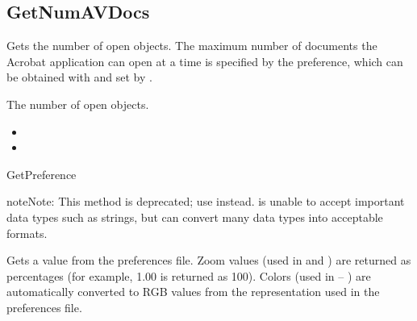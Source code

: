 \documentclass[letterpaper,12pt,english,openany,oneside]{sphinxmanual}
\begin{document}
\subsection{GetNumAVDocs}
\label{\detokenize{IAC_API_OLE_Objects:getnumavdocs}}
Gets the number of open  objects. The maximum number of documents the Acrobat application can open at a time is specified by the  preference, which can be obtained with   and set by   .


\begin{sphinxVerbatim}[commandchars=\\\{\}]
 
\end{sphinxVerbatim}


The number of open  objects.

\label{\detokenize{IAC_API_OLE_Objects:related-methods-7}}
\begin{itemize}
\item {} 
 

\item {} 
 

\end{itemize}



GetPreference

\begin{sphinxadmonition}{note}{Note:}
This method is deprecated; use  instead.  is unable to accept important data types such as strings, but  can convert many data types into acceptable formats.
\end{sphinxadmonition}

Gets a value from the preferences file. Zoom values (used in  and ) are returned as percentages (for example, 1.00 is returned as 100). Colors (used in  – ) are automatically converted to RGB values from the representation used in the preferences file.
\end{document}
